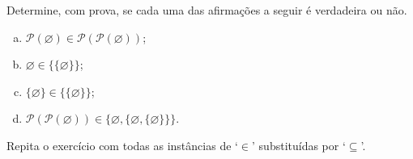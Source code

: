 \begin{exercise}
Determine, com prova, se cada uma das afirmações a seguir é verdadeira ou não.
\begin{enumerate}[(a)]
\item $\mathcal{P}(\varnothing) \in \mathcal{P}(\mathcal{P}(\varnothing))$;
\item $\varnothing \in \{ \{ \varnothing \} \}$;
\item $\{ \varnothing \} \in \{ \{ \varnothing \} \}$;
\item $\mathcal{P}(\mathcal{P}(\varnothing)) \in \{ \varnothing, \{ \varnothing, \{ \varnothing \} \} \}$.
\end{enumerate}
Repita o exercício com todas as instâncias de `$\in$' substituídas por `$\subseteq$'.
\end{exercise}


